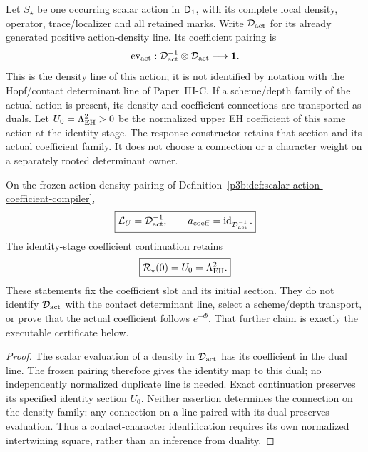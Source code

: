 \documentclass[12pt,a4paper]{article}
\begin{document}
\begin{definition}
\label{p3b:def:scalar-action-coefficient-compiler}
Let $S_\star$ be one occurring scalar action in $\mathsf{D}_1$, with its complete
local density, operator, trace/localizer and all retained marks. Write
$\mathcal D_{\rm act}$ for its already generated positive action-density
line. Its coefficient pairing is
\[
 \operatorname{ev}_{\rm act}:
 \mathcal D_{\rm act}^{-1}\otimes\mathcal D_{\rm act}\longrightarrow\mathbf1.
\]
This is the density line of this action; it is not identified by notation
with the Hopf/contact determinant line of Paper~III-C. If a scheme/depth
family of the actual action is present, its density and coefficient
connections are transported as duals. Let $U_0=\Lambda_{\rm EH}^2>0$ be the
normalized upper EH coefficient of this same action at the identity stage.
The response constructor retains that section and its actual coefficient
family. It does not choose a connection or a character weight on a separately
rooted determinant owner.
\end{definition}

\begin{theorem}
\label{p3b:thm:generated-action-response-owner}
On the frozen action-density pairing of
Definition~\ref{p3b:def:scalar-action-coefficient-compiler},
\begin{equation}
 \label{p3b:eq:generated-action-response-owner}
 \boxed{\mathcal L_U=\mathcal D_{\rm act}^{-1},\qquad
 a_{\rm coeff}=\operatorname{id}_{\mathcal D_{\rm act}^{-1}}.}
\end{equation}
The identity-stage coefficient continuation retains
\begin{equation}
 \label{p3b:eq:generated-action-response-initial-value}
 \boxed{\mathcal R_\star(0)=U_0=\Lambda_{\rm EH}^2.}
\end{equation}
These statements fix the coefficient slot and its initial section. They do
not identify $\mathcal D_{\rm act}$ with the contact determinant line,
select a scheme/depth transport, or prove that the actual coefficient follows
$e^{-\Phi}$. That further claim is exactly the executable certificate below.
\end{theorem}
\begin{proof}
The scalar evaluation of a density in $\mathcal D_{\rm act}$ has its
coefficient in the dual line. The frozen pairing therefore gives the
identity map to this dual; no independently normalized duplicate line is
needed. Exact continuation preserves its specified identity section $U_0$.
Neither assertion determines the connection on the density family: any
connection on a line paired with its dual preserves evaluation. Thus a
contact-character identification requires its own normalized intertwining
square, rather than an inference from duality.
\end{proof}
\end{document}
